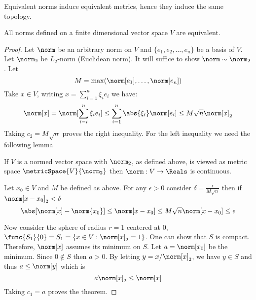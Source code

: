 \begin{remark}
    Equivalent norms induce equivalent metrics, hence they induce the same topology.
\end{remark}

\begin{theorem}
    All norms defined on a finite dimensional vector space \(V\) are equivalent.
\end{theorem}

\begin{proof}
    Let \(\norm\) be an arbitrary norm on \(V\) and \(\{e_1, e_2, \dots , e_n\} \) be a basis of \(V\). Let \(\norm_2\) be \(L_2\)-norm (Euclidean norm). It will suffice to show \(\norm \sim \norm_2\). Let
    \begin{equation*}
        M = \max \! \left( \norm[e_1], \dots , \norm[e_n] \right)
    \end{equation*}
    Take \(x \in V\), writing \(x = \sum_{i = 1}^n {\xi_i e_i}\) we have:
    \begin{equation*}
        \norm[x] = \norm[\sum_{i = i}^n {\xi_i e_i}] \leq \sum_{i = 1}^n \abs{\xi_i} \norm[e_i] \leq M \sqrt{n} \norm[x]_2
    \end{equation*}
    Taking \(c_2 = M \sqrt{n}\) proves the right inequality. For the left inequality we need the following lemma
    \begin{lemma} \label{lm:ContinuityOfNorm}
        If \(V\) is a normed vector space with \(\norm_2\), as defined above, is viewed as metric space \(\metricSpace{V}{\norm_2}\) then \(\norm : V \to \Reals\) is continuous.
    \end{lemma}

    \begin{prooflemma}
        Let \(x_0 \in V\) and \(M\) be defined as above. For any \(\epsilon > 0\) consider \(\delta = \frac{\epsilon}{M \sqrt{n}}\) then if \(\norm[x - x_0]_2 < \delta\)
        \begin{equation*}
            \abs[\norm[x] - \norm{x_0}] \leq \norm[x - x_0] \leq M \sqrt{n} \norm[x - x_0] \leq \epsilon
        \end{equation*}
    \end{prooflemma}

    Now consider the sphere of radius \(r = 1\) centered at \(0\), \(\func{S_1}{0} = S_1 = \{x \in V : \norm[x]_2 = 1\}\). One can show that \(S\) is compact. Therefore, \(\norm[x]\) assumes its minimum on \(S\). Let \( a = \norm[x_0]\) be the minimum. Since \(0 \notin S\) then \(a > 0\). By letting \(y = x / \norm[x]_2 \), we have \(y \in S\) and thus \(a \leq \norm[y]\) which is
    \begin{equation*}
        a \norm[x]_2 \leq \norm[x]
    \end{equation*}
    Taking \(c_1 = a\) proves the theorem.
\end{proof}

